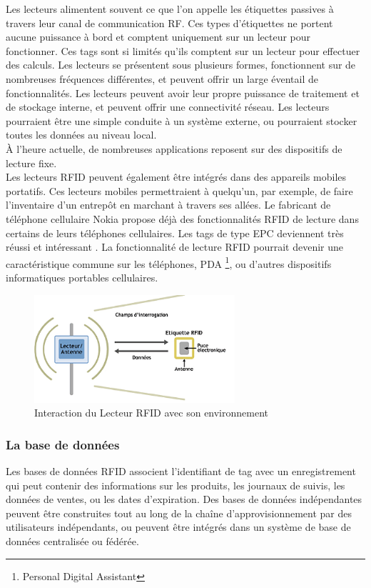 \documentclass[11pt, a4paper, twoside]{book}
\begin{document}
Les lecteurs alimentent souvent ce que l'on appelle les étiquettes passives à travers leur canal de communication RF.
Ces types d'étiquettes ne portent aucune puissance à bord et comptent uniquement sur un lecteur pour fonctionner. Ces tags sont si limités qu'ils comptent sur un lecteur pour effectuer des calculs.
Les lecteurs se présentent sous plusieurs formes, fonctionnent sur de nombreuses fréquences différentes, et peuvent offrir un large éventail de fonctionnalités. Les lecteurs peuvent avoir leur propre puissance de traitement et de stockage interne, et peuvent offrir une connectivité réseau. Les lecteurs pourraient être une simple conduite à un système externe, ou pourraient stocker toutes les données  au niveau local.\\

À l'heure actuelle, de nombreuses applications reposent sur des dispositifs de lecture fixe.\\

Les lecteurs RFID peuvent également être intégrés dans des appareils mobiles portatifs. Ces lecteurs mobiles permettraient à quelqu'un, par exemple, de faire l'inventaire d'un entrepôt en marchant à travers ses allées. Le fabricant de téléphone cellulaire Nokia propose déjà des fonctionnalités RFID de lecture dans certains de leurs téléphones cellulaires. Les tags de type EPC deviennent très réussi et intéressant . La fonctionnalité de lecture RFID pourrait devenir une caractéristique commune sur les téléphones, PDA \footnote{Personal Digital Assistant}, ou d'autres dispositifs informatiques portables cellulaires.
\begin{figure}[H]
\centering
\includegraphics[height=4cm]{reader}
\caption{Interaction du Lecteur RFID avec son environnement}
\end{figure}
\subsubsection{La base de données}
Les bases de données RFID associent l'identifiant de tag avec un enregistrement qui peut contenir des informations sur les produits, les journaux de suivis, les données de ventes, ou les dates d'expiration. Des bases de données indépendantes peuvent être construites tout au long de la chaîne d'approvisionnement par des utilisateurs indépendants, ou peuvent être intégrés dans un système de base de données centralisée ou fédérée.\\
\end{document}
